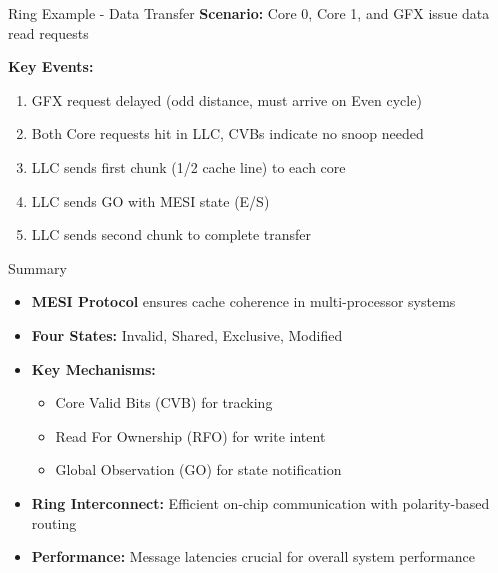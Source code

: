 \documentclass[aspectratio=169,12pt]{beamer}
\begin{document}
\begin{frame}{Ring Example - Data Transfer}
\footnotesize
\textbf{Scenario:} Core 0, Core 1, and GFX issue data read requests

\vspace{0.5em}
\begin{center}
\end{center}

\vspace{0.5em}
\textbf{Key Events:}
\begin{enumerate}
\item GFX request delayed (odd distance, must arrive on Even cycle)
\item Both Core requests hit in LLC, CVBs indicate no snoop needed
\item LLC sends first chunk (1/2 cache line) to each core
\item LLC sends GO with MESI state (E/S)
\item LLC sends second chunk to complete transfer
\end{enumerate}
\end{frame}

\begin{frame}{Summary}
\begin{itemize}
\item \textbf{MESI Protocol} ensures cache coherence in multi-processor systems
\vspace{0.5em}
\item \textbf{Four States:} Invalid, Shared, Exclusive, Modified
\vspace{0.5em}
\item \textbf{Key Mechanisms:}
    \begin{itemize}
    \item Core Valid Bits (CVB) for tracking
    \item Read For Ownership (RFO) for write intent
    \item Global Observation (GO) for state notification
    \end{itemize}
\vspace{0.5em}
\item \textbf{Ring Interconnect:} Efficient on-chip communication with polarity-based routing
\vspace{0.5em}
\item \textbf{Performance:} Message latencies crucial for overall system performance
\end{itemize}
\end{frame}
\end{document}
